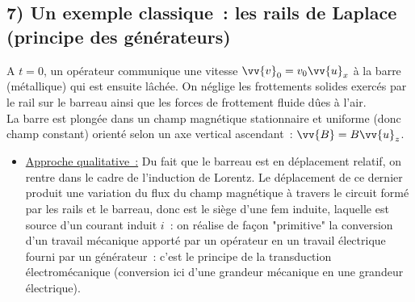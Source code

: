 \documentclass{article}
\renewcommand\overrightarrow{\vv}
\begin{document}
\subsection*{7)  Un exemple classique : les rails de Laplace (principe des
générateurs)} A $t = 0$, un opérateur communique une
vitesse $\overrightarrow{v}_{0}=v_{0}\overrightarrow{u}_{x}$ à la
barre (métallique) qui est ensuite lâchée. On néglige les
frottements solides exercés par le rail sur le barreau ainsi que les
forces de frottement fluide dûes à
l'air. \\
La barre est plongée dans un champ magnétique stationnaire et
uniforme (donc champ constant) orienté selon un axe vertical
ascendant : $\overrightarrow{B}  =B\overrightarrow{u}_{z}$.
\begin{itemize}
\item \underline{Approche qualitative :} Du fait que le barreau est
en déplacement relatif, on rentre dans le cadre de l'induction de
Lorentz. Le déplacement de ce dernier produit une variation du flux
du champ magnétique à travers le circuit formé par les rails et le
barreau, donc est le siège d'une fem induite, laquelle est source
d'un courant induit $i$ : on réalise de façon "primitive" la
conversion d'un travail mécanique apporté par un opérateur en un
travail électrique fourni par un générateur : c'est le principe de
la transduction électromécanique (conversion ici d'une grandeur
mécanique en une grandeur électrique).



\begin{wrapfigure}{r}{0.25\textwidth}
\caption{}\label{Fig.4}
\end{wrapfigure}




\end{itemize}
\end{document}
